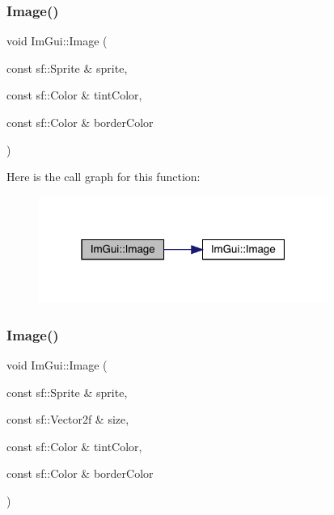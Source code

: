 \subsubsection{\texorpdfstring{Image()}{Image()}\hspace{0.1cm}{\footnotesize\ttfamily [5/6]}}
{\footnotesize\ttfamily void Im\+Gui\+::\+Image (\begin{DoxyParamCaption}\item[{const sf\+::\+Sprite \&}]{sprite,  }\item[{const sf\+::\+Color \&}]{tint\+Color,  }\item[{const sf\+::\+Color \&}]{border\+Color }\end{DoxyParamCaption})}

Here is the call graph for this function\+:
\nopagebreak
\begin{figure}[H]
\begin{center}
\leavevmode
\includegraphics[width=268pt]{df/d13/namespace_im_gui_a12ec1591629f9e4d845ca63501e3d577_cgraph}
\end{center}
\end{figure}
\mbox{\label{namespace_im_gui_ad852f4318abae0ec25a66620811eeb3a}} 
\subsubsection{\texorpdfstring{Image()}{Image()}\hspace{0.1cm}{\footnotesize\ttfamily [6/6]}}
{\footnotesize\ttfamily void Im\+Gui\+::\+Image (\begin{DoxyParamCaption}\item[{const sf\+::\+Sprite \&}]{sprite,  }\item[{const sf\+::\+Vector2f \&}]{size,  }\item[{const sf\+::\+Color \&}]{tint\+Color,  }\item[{const sf\+::\+Color \&}]{border\+Color }\end{DoxyParamCaption})}

